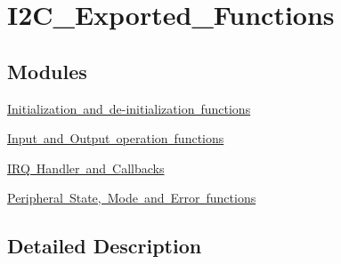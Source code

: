 \hypertarget{group___i2_c___exported___functions}{}\section{I2\+C\+\_\+\+Exported\+\_\+\+Functions}
\label{group___i2_c___exported___functions}
\subsection*{Modules}
\begin{DoxyCompactItemize}
\item 
\mbox{\hyperlink{group___i2_c___exported___functions___group1}{Initialization and de-\/initialization functions}}
\item 
\mbox{\hyperlink{group___i2_c___exported___functions___group2}{Input and Output operation functions}}
\item 
\mbox{\hyperlink{group___i2_c___i_r_q___handler__and___callbacks}{I\+R\+Q Handler and Callbacks}}
\item 
\mbox{\hyperlink{group___i2_c___exported___functions___group3}{Peripheral State, Mode and Error functions}}
\end{DoxyCompactItemize}


\subsection{Detailed Description}
